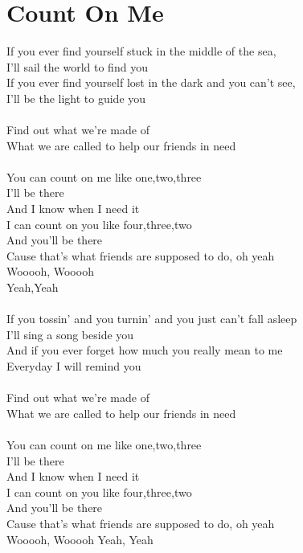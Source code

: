 \section{Count On Me}
If you ever find yourself stuck in the middle of the sea,\\
I'll sail the world to find you\\
If you ever find yourself lost in the dark and you can't see,\\
I'll be the light to guide you\\
\\
Find out what we're made of\\
What we are called to help our friends in need\\
\\
You can count on me like one,two,three\\
I'll be there\\
And I know when I need it \\
I can count on you like four,three,two\\
And you'll be there\\
Cause that's what friends are supposed to do, oh yeah\\
Wooooh, Wooooh\\
Yeah,Yeah\\
\\
If you tossin' and you turnin' and you just can't fall asleep\\
I'll sing a song beside you\\
And if you ever forget how much you really mean to me\\
Everyday I will remind you \\
\\
Find out what we're made of\\
What we are called to help our friends in need\\
\\
You can count on me like one,two,three\\
I'll be there\\
And I know when I need it \\
I can count on you like four,three,two\\
And you'll be there\\
Cause that's what friends are supposed to do, oh yeah\\
Wooooh, Wooooh Yeah, Yeah\\
\\

